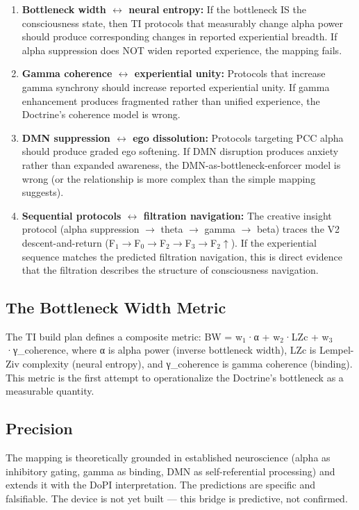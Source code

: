\begin{enumerate}[nosep,leftmargin=*]
  \item \textbf{Bottleneck width $\leftrightarrow$ neural entropy:} If the bottleneck IS the consciousness state, then TI protocols that measurably change alpha power should produce corresponding changes in reported experiential breadth. If alpha suppression does NOT widen reported experience, the mapping fails.
  \item \textbf{Gamma coherence $\leftrightarrow$ experiential unity:} Protocols that increase gamma synchrony should increase reported experiential unity. If gamma enhancement produces fragmented rather than unified experience, the Doctrine's coherence model is wrong.
  \item \textbf{DMN suppression $\leftrightarrow$ ego dissolution:} Protocols targeting PCC alpha should produce graded ego softening. If DMN disruption produces anxiety rather than expanded awareness, the DMN-as-bottleneck-enforcer model is wrong (or the relationship is more complex than the simple mapping suggests).
  \item \textbf{Sequential protocols $\leftrightarrow$ filtration navigation:} The creative insight protocol (alpha suppression $\rightarrow$ theta $\rightarrow$ gamma $\rightarrow$ beta) traces the V2 descent-and-return (F$_1$$\rightarrow$F$_0$$\rightarrow$F$_2$$\rightarrow$F$_3$$\rightarrow$F$_2$$\uparrow$). If the experiential sequence matches the predicted filtration navigation, this is direct evidence that the filtration describes the structure of consciousness navigation.
\end{enumerate}


\subsection*{The Bottleneck Width Metric}


The TI build plan defines a composite metric: BW = w$_1$·α + w$_2$·LZc + w$_3$·γ\_coherence, where α is alpha power (inverse bottleneck width), LZc is Lempel-Ziv complexity (neural entropy), and γ\_coherence is gamma coherence (binding). This metric is the first attempt to operationalize the Doctrine's bottleneck as a measurable quantity.


\subsection*{Precision}


The mapping is theoretically grounded in established neuroscience (alpha as inhibitory gating, gamma as binding, DMN as self-referential processing) and extends it with the DoPI interpretation. The predictions are specific and falsifiable. The device is not yet built — this bridge is predictive, not confirmed.


